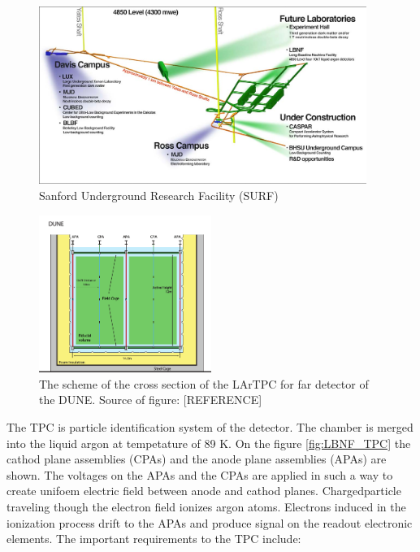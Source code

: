 \begin{figure}
\caption{Sanford Underground Research Facility (SURF)}
\label{fig:farDetector_SURF2}
\centering
\includegraphics[width=0.95\textwidth, keepaspectratio=true]{figs/farDetector_wholeLab.png}
\end{figure}

\begin{figure}
\caption{The scheme of the cross section of the LArTPC for far detector of the DUNE. Source of figure: [REFERENCE]}
\label{fig:farDetector_TPC}
\centering
\includegraphics[width=0.50\textwidth, keepaspectratio=true]{figs/farDetector_TPC.png}
\end{figure}

The TPC is particle identification system of the detector. The chamber is merged into the liquid argon at tempetature of 89 K. On the figure \ref{fig:LBNF_TPC} the cathod plane assemblies (CPAs) and the anode plane assemblies (APAs) are shown. The voltages on the APAs and the CPAs are applied in such a way to create unifoem electric field between anode and cathod planes. Chargedparticle traveling though the electron field ionizes argon atoms. Electrons induced in the ionization process drift to the APAs and produce signal on the readout electronic elements.
The important requirements to the TPC include:

